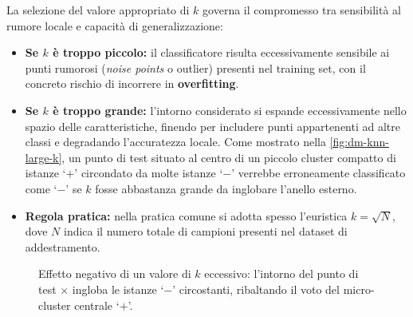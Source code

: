 La selezione del valore appropriato di $k$ governa il compromesso tra sensibilit\`a al rumore locale e capacit\`a di generalizzazione:
\begin{itemize}
    \item \textbf{Se $k$ \`e troppo piccolo:} il classificatore risulta eccessivamente sensibile ai punti rumorosi (\textit{noise points} o outlier) presenti nel training set, con il concreto rischio di incorrere in \textbf{overfitting}.
    \item \textbf{Se $k$ \`e troppo grande:} l'intorno considerato si espande eccessivamente nello spazio delle caratteristiche, finendo per includere punti appartenenti ad altre classi e degradando l'accuratezza locale. Come mostrato nella \autoref{fig:dm-knn-large-k}, un punto di test situato al centro di un piccolo cluster compatto di istanze `$+$' circondato da molte istanze `$-$' verrebbe erroneamente classificato come `$-$' se $k$ fosse abbastanza grande da inglobare l'anello esterno.
    \item \textbf{Regola pratica:} nella pratica comune si adotta spesso l'euristica $k = \sqrt{N}$, dove $N$ indica il numero totale di campioni presenti nel dataset di addestramento.
\end{itemize}

\begin{figure}[H]
\centering
{}
\caption{Effetto negativo di un valore di $k$ eccessivo: l'intorno del punto di test $\times$ ingloba le istanze `$-$' circostanti, ribaltando il voto del micro-cluster centrale `$+$'.}
\label{fig:dm-knn-large-k}
\end{figure}

